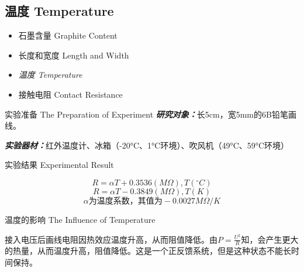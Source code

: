 \documentclass[10pt]{beamer}
\begin{document}
	
	
	
	\subsection{温度 Temperature}
	\begin{frame}%
		\begin{itemize}
			\item 石墨含量 Graphite Content
			\item 长度和宽度 Length and Width
			\item {\LARGE \textit{温度 Temperature}}
			\item 接触电阻 Contact Resistance
		\end{itemize}
	\end{frame}
	
	\begin{frame}{实验准备 The Preparation of Experiment}
		\textbf{\textit{研究对象：}}长5cm，宽5mm的6B铅笔画线。
		\bigskip
		
		\textbf{\textit{实验器材：}}红外温度计、冰箱（-20°C、1°C环境）、吹风机（49°C、59°C环境）\pause
		
	\end{frame}
	
	\begin{frame}{实验结果 Experimental Result}
		
		\begin{theorem}
			\[ R=\alpha T+0.3536(M\Omega), T(^\circ C) \]
			\[ R=\alpha T-0.3849(M\Omega), T(K) \]
			$$ \alpha\text{为温度系数，其值为}-0.0027M\Omega /K $$
			
		\end{theorem}
	\end{frame}
	
	\begin{frame}{温度的影响 The Influence of Temperature }
		
		\qquad 接入电压后画线电阻因热效应温度升高，从而阻值降低。由$ P=\frac{U^2}{R} $知，会产生更大的热量，从而温度升高，阻值降低。这是一个正反馈系统，但是这种状态不能长时间保持。
	\end{frame}
	
\end{document}
